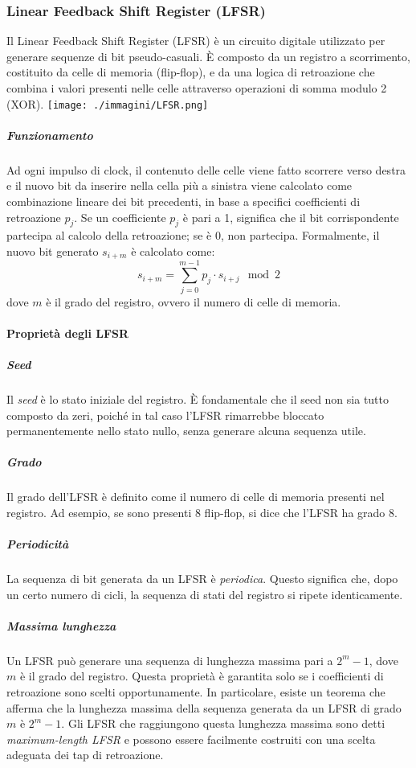 \documentclass{report}
\begin{document}
\subsubsection{Linear Feedback Shift Register (LFSR)}
Il Linear Feedback Shift Register (LFSR) è un circuito digitale utilizzato per generare sequenze di bit pseudo-casuali. È composto da un registro a scorrimento, costituito da celle di memoria (flip-flop), e da una logica di retroazione che combina i valori presenti nelle celle attraverso operazioni di somma modulo 2 (XOR).
\texttt{[image: ./immagini/LFSR.png]}
\subparagraph{Funzionamento}
Ad ogni impulso di clock, il contenuto delle celle viene fatto scorrere verso destra e il nuovo bit da inserire nella cella più a sinistra viene calcolato come combinazione lineare dei bit precedenti, in base a specifici coefficienti di retroazione $p_j$. Se un coefficiente $p_j$ è pari a 1, significa che il bit corrispondente partecipa al calcolo della retroazione; se è 0, non partecipa. Formalmente, il nuovo bit generato $s_{i+m}$ è calcolato come:
\[
s_{i+m} = \sum_{j=0}^{m-1} p_j \cdot s_{i+j} \mod 2
\]
dove $m$ è il grado del registro, ovvero il numero di celle di memoria.

\paragraph{Proprietà degli LFSR}
\subparagraph{Seed}
Il \emph{seed} è lo stato iniziale del registro. È fondamentale che il seed non sia tutto composto da zeri, poiché in tal caso l'LFSR rimarrebbe bloccato permanentemente nello stato nullo, senza generare alcuna sequenza utile.

\subparagraph{Grado}
Il grado dell'LFSR è definito come il numero di celle di memoria presenti nel registro. Ad esempio, se sono presenti 8 flip-flop, si dice che l'LFSR ha grado 8.

\subparagraph{Periodicità}
La sequenza di bit generata da un LFSR è \emph{periodica}. Questo significa che, dopo un certo numero di cicli, la sequenza di stati del registro si ripete identicamente.

\subparagraph{Massima lunghezza}
Un LFSR può generare una sequenza di lunghezza massima pari a $2^m - 1$, dove $m$ è il grado del registro. Questa proprietà è garantita solo se i coefficienti di retroazione sono scelti opportunamente. In particolare, esiste un teorema che afferma che la lunghezza massima della sequenza generata da un LFSR di grado $m$ è $2^m - 1$. Gli LFSR che raggiungono questa lunghezza massima sono detti \emph{maximum-length LFSR} e possono essere facilmente costruiti con una scelta adeguata dei tap di retroazione.
\end{document}
